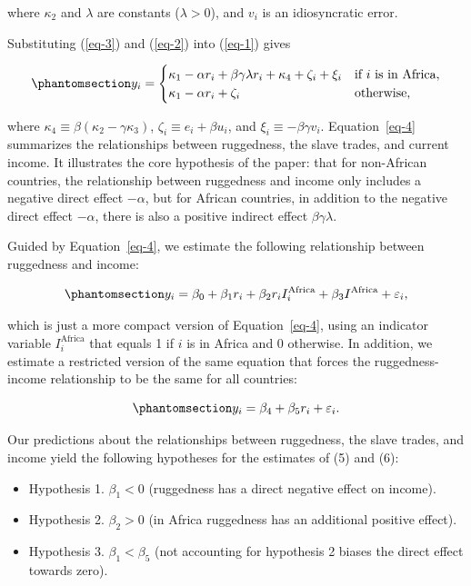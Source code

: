 \documentclass[
  letterpaper,
  DIV=11,
  numbers=noendperiod]{scrartcl}
\providecommand{\tightlist}{%
  \setlength{\itemsep}{0pt}\setlength{\parskip}{0pt}}
\begin{document}
where \(\kappa_2\) and \(\lambda\) are constants (\(\lambda > 0\)), and
\(v_i\) is an idiosyncratic error.

Substituting (\ref{eq-3}) and (\ref{eq-2}) into (\ref{eq-1}) gives

\begin{equation}\protect\phantomsection\label{eq-4}{
y_i = \begin{cases}
\kappa_1 - \alpha r_i + \beta \gamma \lambda r_i + \kappa_4 + \zeta_i + \xi_i &\text{if }i\text{ is in Africa}, \\
\kappa_1 - \alpha r_i + \zeta_i &\text{otherwise},
\end{cases}
}\end{equation}

where \(\kappa_4 \equiv \beta(\kappa_2 − \gamma \kappa_3)\),
\(\zeta_i \equiv e_i + \beta u_i\), and
\(\xi_i \equiv −\beta \gamma v_i\). Equation~\ref{eq-4} summarizes the
relationships between ruggedness, the slave trades, and current income.
It illustrates the core hypothesis of the paper: that for non-African
countries, the relationship between ruggedness and income only includes
a negative direct effect \(−\alpha\), but for African countries, in
addition to the negative direct effect \(−\alpha\), there is also a
positive indirect effect \(\beta \gamma \lambda\).

Guided by Equation~\ref{eq-4}, we estimate the following relationship
between ruggedness and income:

\begin{equation}\protect\phantomsection\label{eq-5}{
y_i = \beta_0 + \beta_1 r_i + \beta_2 r_i I_i^\text{Africa} + \beta_3 I^\text{Africa} + \varepsilon_i,
}\end{equation}

which is just a more compact version of Equation~\ref{eq-4}, using an
indicator variable \(I_i^\text{Africa}\) that equals 1 if \(i\) is in
Africa and 0 otherwise. In addition, we estimate a restricted version of
the same equation that forces the ruggedness-income relationship to be
the same for all countries:

\begin{equation}\protect\phantomsection\label{eq-6}{
y_i = \beta_4 + \beta_5 r_i + \varepsilon_i.
}\end{equation}

Our predictions about the relationships between ruggedness, the slave
trades, and income yield the following hypotheses for the estimates of
(5) and (6):

\begin{itemize}
\tightlist
\item
  Hypothesis 1. \(\beta_1 < 0\) (ruggedness has a direct negative effect
  on income).
\item
  Hypothesis 2. \(\beta_2 > 0\) (in Africa ruggedness has an additional
  positive effect).
\item
  Hypothesis 3. \(\beta_1 < \beta_5\) (not accounting for hypothesis 2
  biases the direct effect towards zero).
\end{itemize}
\end{document}
